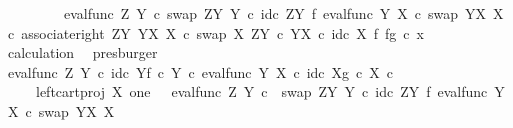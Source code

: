 \begin{isabellebody}
\ \ \ \ \ \ \ \ \ {\isacharparenleft}{\kern0pt}{\isacharparenleft}{\kern0pt}eval{\isacharunderscore}{\kern0pt}func\ Z\ Y\ {\isasymcirc}\isactrlsub c\ swap\ {\isacharparenleft}{\kern0pt}Z\isactrlbsup Y\isactrlesup {\isacharparenright}{\kern0pt}\ Y\ {\isasymcirc}\isactrlsub c\ {\isacharparenleft}{\kern0pt}id\isactrlsub c\ {\isacharparenleft}{\kern0pt}Z\isactrlbsup Y\isactrlesup {\isacharparenright}{\kern0pt}\ {\isasymtimes}\isactrlsub f\ eval{\isacharunderscore}{\kern0pt}func\ Y\ X\ {\isasymcirc}\isactrlsub c\ swap\ {\isacharparenleft}{\kern0pt}Y\isactrlbsup X\isactrlesup {\isacharparenright}{\kern0pt}\ X{\isacharparenright}{\kern0pt}\ {\isasymcirc}\isactrlsub c\ associate{\isacharunderscore}{\kern0pt}right\ {\isacharparenleft}{\kern0pt}Z\isactrlbsup Y\isactrlesup {\isacharparenright}{\kern0pt}\ {\isacharparenleft}{\kern0pt}Y\isactrlbsup X\isactrlesup {\isacharparenright}{\kern0pt}\ X\ {\isasymcirc}\isactrlsub c\ swap\ X\ {\isacharparenleft}{\kern0pt}Z\isactrlbsup Y\isactrlesup \ {\isasymtimes}\isactrlsub c\ Y\isactrlbsup X\isactrlesup {\isacharparenright}{\kern0pt}{\isacharparenright}{\kern0pt}\ {\isasymcirc}\isactrlsub c\ id\isactrlsub c\ X\ {\isasymtimes}\isactrlsub f\ {\isasymlangle}f{\isacharcomma}{\kern0pt}g{\isasymrangle}{\isacharparenright}{\kern0pt}\ {\isasymcirc}\isactrlsub c\ x{}{\isachardoublequoteclose}\isanewline
\ \ \ \ \ \ \isamarkupfalse%
\ calculation\ \isamarkupfalse%
\ presburger\isanewline
\ \ \isamarkupfalse%
\isanewline
\ \ \isamarkupfalse%
\ \isamarkupfalse%
\ {\isachardoublequoteopen}{\isacharparenleft}{\kern0pt}{\isacharparenleft}{\kern0pt}{\isacharparenleft}{\kern0pt}eval{\isacharunderscore}{\kern0pt}func\ Z\ Y\ {\isasymcirc}\isactrlsub c\ {\isasymlangle}id\isactrlsub c\ Y{\isacharcomma}{\kern0pt}f\ {\isasymcirc}\isactrlsub c\ {\isasymbeta}\isactrlbsub Y\isactrlesub {\isasymrangle}{\isacharparenright}{\kern0pt}\ {\isasymcirc}\isactrlsub c\ eval{\isacharunderscore}{\kern0pt}func\ Y\ X\ {\isasymcirc}\isactrlsub c\ {\isasymlangle}id\isactrlsub c\ X{\isacharcomma}{\kern0pt}g\ {\isasymcirc}\isactrlsub c\ {\isasymbeta}\isactrlbsub X\isactrlesub {\isasymrangle}{\isacharparenright}{\kern0pt}\ {\isasymcirc}\isactrlsub c\isanewline
\ \ \ \ \ left{\isacharunderscore}{\kern0pt}cart{\isacharunderscore}{\kern0pt}proj\ X\ one{\isacharparenright}{\kern0pt}\isactrlsup {\isasymsharp}\ {\isacharequal}{\kern0pt}\ \ {\isacharparenleft}{\kern0pt}eval{\isacharunderscore}{\kern0pt}func\ Z\ Y\ {\isasymcirc}\isactrlsub c\ \ swap\ {\isacharparenleft}{\kern0pt}Z\isactrlbsup Y\isactrlesup {\isacharparenright}{\kern0pt}\ Y\ {\isasymcirc}\isactrlsub c\ {\isacharparenleft}{\kern0pt}id\isactrlsub c\ {\isacharparenleft}{\kern0pt}Z\isactrlbsup Y\isactrlesup {\isacharparenright}{\kern0pt}\ {\isasymtimes}\isactrlsub f\ {\isacharparenleft}{\kern0pt}eval{\isacharunderscore}{\kern0pt}func\ Y\ X\ {\isasymcirc}\isactrlsub c\ swap\ {\isacharparenleft}{\kern0pt}Y\isactrlbsup X\isactrlesup {\isacharparenright}{\kern0pt}\ X{\isacharparenright}{\kern0pt}{\isacharparenright}{\kern0pt}\isanewline

\end{isabellebody}
